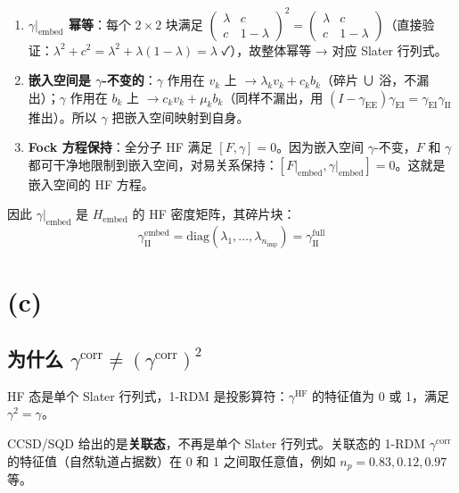 \documentclass[11pt,a4paper]{article}
\begin{document}
\begin{enumerate}
  \item \textbf{$\gamma\big|_{\text{embed}}$ 幂等}：每个 $2 \times 2$ 块满足 $\begin{pmatrix} \lambda & c \\ c & 1{-}\lambda \end{pmatrix}^2 = \begin{pmatrix} \lambda & c \\ c & 1{-}\lambda \end{pmatrix}$（直接验证：$\lambda^2 + c^2 = \lambda^2 + \lambda(1{-}\lambda) = \lambda$ ✓），故整体幂等 → 对应 Slater 行列式。

  \item \textbf{嵌入空间是 $\gamma$-不变的}：$\gamma$ 作用在 $v_k$ 上 $\to \lambda_k v_k + c_k b_k$（碎片 ∪ 浴，不漏出）；$\gamma$ 作用在 $b_k$ 上 $\to c_k v_k + \mu_k b_k$（同样不漏出，用 $(I - \gamma_{\text{EE}})\gamma_{\text{EI}} = \gamma_{\text{EI}}\gamma_{\text{II}}$ 推出）。所以 $\gamma$ 把嵌入空间映射到自身。

  \item \textbf{Fock 方程保持}：全分子 HF 满足 $[F, \gamma] = 0$。因为嵌入空间 $\gamma$-不变，$F$ 和 $\gamma$ 都可干净地限制到嵌入空间，对易关系保持：$[F\big|_{\text{embed}}, \gamma\big|_{\text{embed}}] = 0$。这就是嵌入空间的 HF 方程。
\end{enumerate}

因此 $\gamma\big|_{\text{embed}}$ 是 $H_{\text{embed}}$ 的 HF 密度矩阵，其碎片块：
\begin{equation}
  \boxed{\;\gamma_{\text{II}}^{\text{embed}} = \text{diag}(\lambda_1, \ldots, \lambda_{n_{\text{imp}}}) = \gamma_{\text{II}}^{\text{full}}\;}
\end{equation}

\section{(c) }

\subsection{为什么 $\gamma^{\text{corr}} \neq (\gamma^{\text{corr}})^2$}

HF 态是单个 Slater 行列式，1-RDM 是投影算符：$\gamma^{\text{HF}}$ 的特征值为 0 或 1，满足 $\gamma^2 = \gamma$。

CCSD/SQD 给出的是\textbf{关联态}，不再是单个 Slater 行列式。关联态的 1-RDM $\gamma^{\text{corr}}$ 的特征值（自然轨道占据数）在 0 和 1 之间取任意值，例如 $n_p = 0.83, 0.12, 0.97$ 等。
\end{document}
